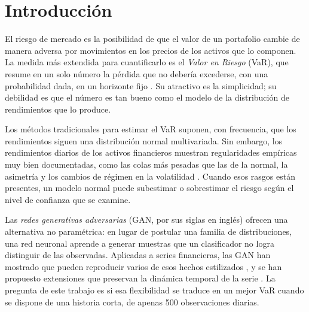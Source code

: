 \documentclass[12pt,letterpaper]{article}
\newcommand{\fechaentrega}{Noviembre de 2026}
\begin{document}
\begin{titlepage}
\end{titlepage}

\newpage
\setcounter{page}{2}
\tableofcontents

\newpage

\section{Introducción}

El riesgo de mercado es la posibilidad de que el valor de un portafolio cambie de manera adversa por movimientos en los precios de los activos que lo componen. La medida más extendida para cuantificarlo es el \emph{Valor en Riesgo} (VaR), que resume en un solo número la pérdida que no debería excederse, con una probabilidad dada, en un horizonte fijo \cite{jorion2007}. Su atractivo es la simplicidad; su debilidad es que el número es tan bueno como el modelo de la distribución de rendimientos que lo produce.

Los métodos tradicionales para estimar el VaR suponen, con frecuencia, que los rendimientos siguen una distribución normal multivariada. Sin embargo, los rendimientos diarios de los activos financieros muestran regularidades empíricas muy bien documentadas, como las colas más pesadas que las de la normal, la asimetría y los cambios de régimen en la volatilidad \cite{cont2001}. Cuando esos rasgos están presentes, un modelo normal puede subestimar o sobrestimar el riesgo según el nivel de confianza que se examine.

Las \emph{redes generativas adversarias} (GAN, por sus siglas en inglés) \cite{goodfellow2014} ofrecen una alternativa no paramétrica: en lugar de postular una familia de distribuciones, una red neuronal aprende a generar muestras que un clasificador no logra distinguir de las observadas. Aplicadas a series financieras, las GAN han mostrado que pueden reproducir varios de esos hechos estilizados \cite{takahashi2019}, y se han propuesto extensiones que preservan la dinámica temporal de la serie \cite{yoon2019}. La pregunta de este trabajo es si esa flexibilidad se traduce en un mejor VaR cuando se dispone de una historia corta, de apenas 500 observaciones diarias.
\end{document}
